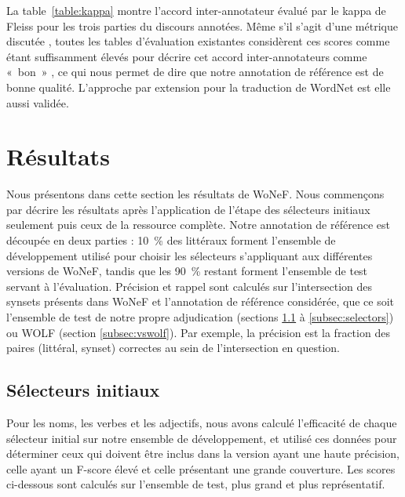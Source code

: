 La table~\ref{table:kappa} montre l'accord inter-annotateur évalué par le kappa de Fleiss pour les trois parties du discours annotées. Même s'il s'agit d'une métrique discutée \citep{powers2012problem}, toutes les tables d'évaluation existantes considèrent ces scores comme étant suffisamment élevés pour décrire cet accord inter-annotateurs comme «~bon~» \citep{gwet2001handbook}, ce qui nous permet de dire que notre annotation de référence est de bonne qualité. L'approche par extension pour la traduction de WordNet est elle aussi validée.

\section{Résultats}
\label{sec:results}


Nous présentons dans cette section les résultats de WoNeF. Nous commençons par décrire les résultats après l'application de l'étape des sélecteurs initiaux seulement puis ceux de la ressource complète. Notre annotation de référence est découpée en deux parties : 10~\% des littéraux forment l'ensemble de développement utilisé pour choisir les sélecteurs s'appliquant aux différentes versions de WoNeF, tandis que les 90~\% restant forment l'ensemble de test servant à l'évaluation. Précision et rappel sont calculés sur l'intersection des synsets présents dans WoNeF et l'annotation de référence considérée, que ce soit l'ensemble de test de notre propre adjudication (sections \ref{subsec:heuristics} à \ref{subsec:selectors}) ou WOLF (section \ref{subsec:vswolf}). Par exemple, la précision est la fraction des paires (littéral, synset) correctes au sein de l'intersection en question.

\subsection{Sélecteurs initiaux}
\label{subsec:heuristics}

Pour les noms, les verbes et les adjectifs, nous avons calculé l'efficacité de chaque sélecteur initial sur notre ensemble de développement, et utilisé ces données pour déterminer ceux qui doivent être inclus dans la version ayant une haute précision, celle ayant un F-score élevé et celle présentant une grande couverture. Les scores ci-dessous sont calculés sur l'ensemble de test, plus grand et plus représentatif.

